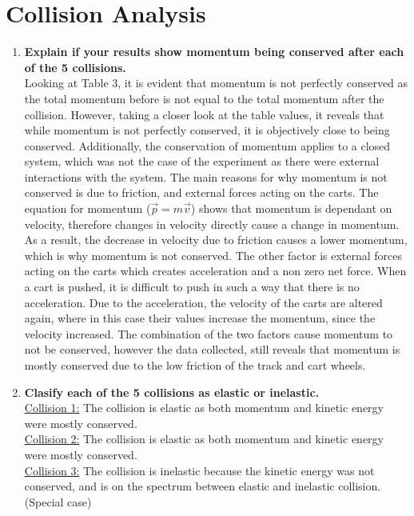 \documentclass[12pt,letterpaper]{article}
\begin{document}
\section{Collision Analysis}
\begin{enumerate}
	\item \textbf{Explain if your results show momentum being conserved after each of the 5 collisions.}\\
	      Looking at Table 3, it is evident that momentum is not perfectly conserved as the total momentum before is not equal to the total momentum after the collision.
	      However, taking a closer look at the table values, it reveals that while momentum is not perfectly conserved, it is objectively close to being conserved.
	      Additionally, the conservation of momentum applies to a closed system, which was not the case of the experiment as there were external interactions with the system.
	      The main reasons for why momentum is not conserved is due to friction, and external forces acting on the carts.
	      The equation for momentum ($\vec{p} = m\vec{v}$) shows that momentum is dependant on velocity, therefore changes in velocity directly cause a change in momentum.
	      As a result, the decrease in velocity due to friction causes a lower momentum, which is why momentum is not conserved.
	      The other factor is external forces acting on the carts which creates acceleration and a non zero net force.
	      When a cart is pushed, it is difficult to push in such a way that there is no acceleration.
	      Due to the acceleration, the velocity of the carts are altered again, where in this case their values increase the momentum, since the velocity increased.
	      The combination of the two factors cause momentum to not be conserved, however the data collected, still reveals that momentum is mostly conserved due to the low friction of the track and cart wheels.
	\item \textbf{Clasify each of the 5 collisions as elastic or inelastic.}\\
	      \underline{Collision 1:} The collision is elastic as both momentum and kinetic energy were mostly conserved.\\
	      \underline{Collision 2:} The collision is elastic as both momentum and kinetic energy were mostly conserved.\\
	      \underline{Collision 3:} The collision is inelastic because the kinetic energy was not conserved, and is on the spectrum between elastic and inelastic collision. (Special case)\\

\end{enumerate}
\end{document}
